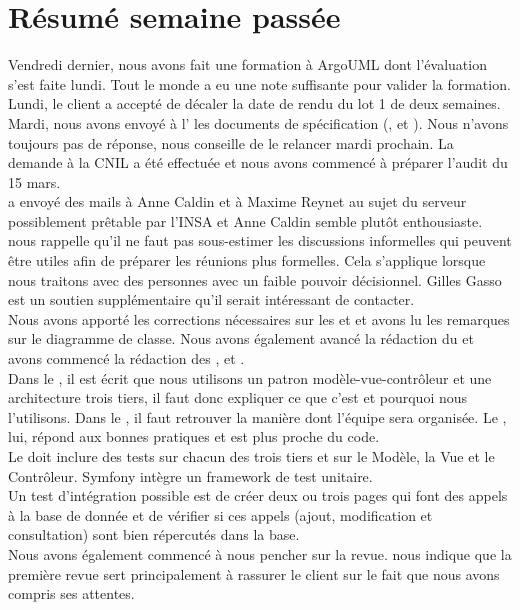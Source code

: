 \documentclass [a4paper] {article}
\begin{document}
\section{Résumé semaine passée}
Vendredi dernier, nous avons fait une formation à ArgoUML dont l'évaluation s'est faite lundi. Tout le monde a eu une note suffisante pour valider la formation. Lundi, le client a accepté de décaler la date de rendu du lot 1 de deux semaines. Mardi, nous avons envoyé à l'\nomClient{} les documents de spécification (\DSE{}, \DSI{} et \PTV{}). Nous n'avons toujours pas de réponse, \nomTuteurPedago{} nous conseille de le relancer mardi prochain. La demande à la CNIL a été effectuée et nous avons commencé à préparer l'audit du 15 mars.\\
\Sergi{} a envoyé des mails à Anne Caldin et à Maxime Reynet au sujet du serveur possiblement prêtable par l'INSA et Anne Caldin semble plutôt enthousiaste. \nomTuteurPedago{} nous rappelle qu'il ne faut pas sous-estimer les discussions informelles qui peuvent être utiles afin de préparer les réunions plus formelles. Cela s'applique lorsque nous traitons avec des personnes avec un faible pouvoir décisionnel. Gilles Gasso est un soutien supplémentaire qu'il serait intéressant de contacter.\\
Nous avons apporté les corrections nécessaires sur les \DSI{} et \PTV{} et avons lu les remarques sur le diagramme de classe. Nous avons également avancé la rédaction du \DCP{} et avons commencé la rédaction des \DCD{}, \PTI{} et \PTU{}. \\
Dans le \DSI{}, il est écrit que nous utilisons un patron modèle-vue-contrôleur et une architecture trois tiers, il faut donc expliquer ce que c'est et pourquoi nous l'utilisons. Dans le \DCP{}, il faut retrouver la manière dont l'équipe sera organisée. Le \DCD{}, lui, répond aux bonnes pratiques et est plus proche du code. \\
Le \PTV{} doit inclure des tests sur chacun des trois tiers et sur le Modèle, la Vue et le Contrôleur. Symfony intègre un framework de test unitaire. \\
Un test d'intégration possible est de créer deux ou trois pages qui font des appels à la base de donnée et de vérifier si ces appels (ajout, modification et consultation) sont bien répercutés dans la base. \\
Nous avons également commencé à nous pencher sur la revue. \nomTuteurPedago{} nous indique que la première revue sert principalement à rassurer le client sur le fait que nous avons compris ses attentes.
\end{document}
